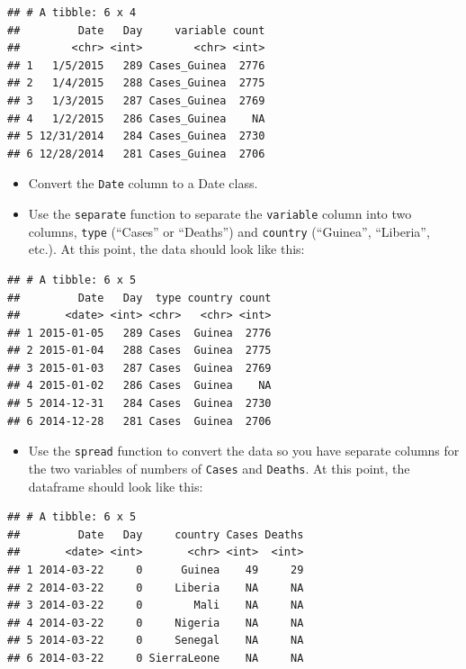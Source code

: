 \documentclass[]{book}
\providecommand{\tightlist}{%
  \setlength{\itemsep}{0pt}\setlength{\parskip}{0pt}}
\theoremstyle{definition}
\theoremstyle{definition}
\theoremstyle{definition}
\theoremstyle{remark}
\begin{document}
\begin{verbatim}
## # A tibble: 6 x 4
##         Date   Day     variable count
##        <chr> <int>        <chr> <int>
## 1   1/5/2015   289 Cases_Guinea  2776
## 2   1/4/2015   288 Cases_Guinea  2775
## 3   1/3/2015   287 Cases_Guinea  2769
## 4   1/2/2015   286 Cases_Guinea    NA
## 5 12/31/2014   284 Cases_Guinea  2730
## 6 12/28/2014   281 Cases_Guinea  2706
\end{verbatim}

\begin{itemize}
\tightlist
\item
  Convert the \texttt{Date} column to a Date class.
\item
  Use the \texttt{separate} function to separate the \texttt{variable}
  column into two columns, \texttt{type} (``Cases'' or ``Deaths'') and
  \texttt{country} (``Guinea'', ``Liberia'', etc.). At this point, the
  data should look like this:
\end{itemize}

\begin{verbatim}
## # A tibble: 6 x 5
##         Date   Day  type country count
##       <date> <int> <chr>   <chr> <int>
## 1 2015-01-05   289 Cases  Guinea  2776
## 2 2015-01-04   288 Cases  Guinea  2775
## 3 2015-01-03   287 Cases  Guinea  2769
## 4 2015-01-02   286 Cases  Guinea    NA
## 5 2014-12-31   284 Cases  Guinea  2730
## 6 2014-12-28   281 Cases  Guinea  2706
\end{verbatim}

\begin{itemize}
\tightlist
\item
  Use the \texttt{spread} function to convert the data so you have
  separate columns for the two variables of numbers of \texttt{Cases}
  and \texttt{Deaths}. At this point, the dataframe should look like
  this:
\end{itemize}

\begin{verbatim}
## # A tibble: 6 x 5
##         Date   Day     country Cases Deaths
##       <date> <int>       <chr> <int>  <int>
## 1 2014-03-22     0      Guinea    49     29
## 2 2014-03-22     0     Liberia    NA     NA
## 3 2014-03-22     0        Mali    NA     NA
## 4 2014-03-22     0     Nigeria    NA     NA
## 5 2014-03-22     0     Senegal    NA     NA
## 6 2014-03-22     0 SierraLeone    NA     NA
\end{verbatim}
\end{document}
